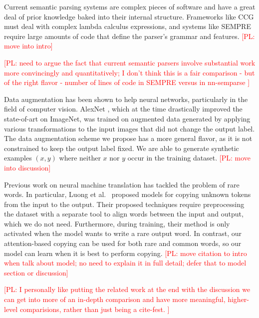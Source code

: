 \documentclass[11pt,letterpaper]{article}
\newcommand\pl[1]{\textcolor{red}{[PL: #1]}}
\begin{document}
Current semantic parsing systems are complex pieces of software 
and have a great deal of prior knowledge baked into their internal structure.
Frameworks like CCG must deal with complex lambda calculus expressions,
and systems like SEMPRE \cite{berant2013freebase}
require large amounts of code that define the parser's grammar and features.
\pl{move into intro}

\pl{need to argue the fact that current semantic parsers involve substantial
  work more convincingly and quantitatively;
  I don't think this is a fair comparison - but of the right flavor - number of lines
  of code in SEMPRE versus in nn-semparse
}

Data augmentation has been shown to help neural networks,
particularly in the field of computer vision.
AlexNet \cite{krizhevsky2012imagenet}, 
which at the time drastically improved
the state-of-art on ImageNet,
was trained on augmented data generated by applying various transformations
to the input images that did not change the output label.
The data augmentation scheme we propose has a more general flavor,
as it is not constrained to keep the output label fixed.
We are able to generate synthetic examples $(x, y)$
where neither $x$ nor $y$ occur in the training dataset.
\pl{move into discussion}

Previous work on neural machine translation has
tackled the problem of rare words.
In particular, Luong et al.~
proposed models for copying unknown
tokens from the input to the output.
Their proposed techniques require preprocessing the dataset
with a separate tool to align words between the input and output,
which we do not need.
Furthermore, during training, their method is only activated when the model
wants to write a rare output word. 
In contrast, our attention-based copying can be used for 
both rare and common words,
so our model can learn when it is best to perform copying.
\pl{move citation to intro when talk about model;
  no need to explain it in full detail;
defer that to model section or discussion}

\pl{I personally like putting the related work at the end with the discussion
we can get into more of an in-depth comparison and have more meaningful,
higher-level comparisions, rather than just being a cite-fest.
}
\end{document}
